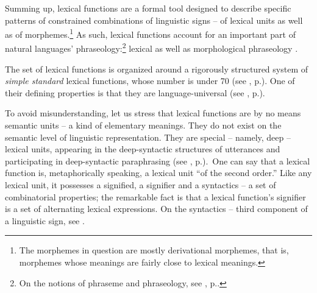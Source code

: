 Summing up, lexical functions are a formal tool designed to describe specific patterns of constrained combinations of linguistic signs -- of lexical units as well as of morphemes.\footnote{The morphemes in question are mostly derivational morphemes, that is, morphemes whose meanings are fairly close to lexical meanings.} As such, lexical functions account for an important part of natural languages' phraseology:\footnote{On the notions of phraseme and phraseology, see , p.\thinspace\pageref{sec:lexicalNotions}.} lexical as well as morphological phraseology \parencite{Melcuk2021b}.\label{txt:LFsAndPhraseology}

The set of lexical functions is organized around a rigorously structured system of \emph{simple standard} lexical functions, whose number is under 70 (see , p.\thinspace\pageref{tab:systFL}). One of their defining properties is that they are language-universal (see , p.\thinspace\pageref{sec:universality}).

\begin{soundboxnotitle}
To avoid misunderstanding, let us stress that lexical functions are by no means semantic units -- a kind of elementary meanings. They do not exist on the semantic level of linguistic represen­tation. They are special -- namely, deep -- lexical units, appearing in the deep-syntactic structures of utterances and participating in deep-syntactic paraphrasing (see , p.\thinspace\pageref{sec:DSyntAndLFs}).\footnotemark\ One can say that a lexical function is, metaphorically speaking, a lexical unit ``of the second order.'' Like any lexical unit, it possesses a signified, a signifier and a syntactics -- a set of combinatorial properties; the remarkable fact is that a lexical function's signifier is a set of alternating lexical expressions. On the syntactics -- third component of a linguistic sign, see \textcite{Melcuk2013a}.
\end{soundboxnotitle}

